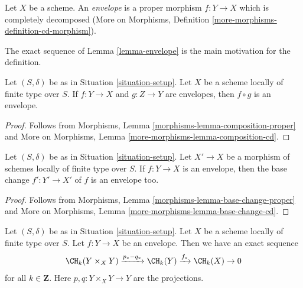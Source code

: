 \begin{definition}
\label{definition-envelope}
\begin{reference}
\cite[Definition 18.3]{F}
\end{reference}
Let $X$ be a scheme. An {\it envelope} is a proper morphism $f : Y \to X$
which is completely decomposed
(More on Morphisms, Definition \ref{more-morphisms-definition-cd-morphism}).
\end{definition}

\noindent
The exact sequence of Lemma \ref{lemma-envelope}
is the main motivation for the definition.

\begin{lemma}
\label{lemma-composition-envelope}
Let $(S, \delta)$ be as in Situation \ref{situation-setup}.
Let $X$ be a scheme locally of finite type over $S$.
If $f : Y \to X$ and $g : Z \to Y$ are envelopes, then
$f \circ g$ is an envelope.
\end{lemma}

\begin{proof}
Follows from Morphisms, Lemma \ref{morphisms-lemma-composition-proper}
and More on Morphisms, Lemma \ref{more-morphisms-lemma-composition-cd}.
\end{proof}

\begin{lemma}
\label{lemma-base-change-envelope}
Let $(S, \delta)$ be as in Situation \ref{situation-setup}.
Let $X' \to X$ be a morphism of schemes locally of finite type over $S$.
If $f : Y \to X$ is an envelope, then the base change $f' : Y' \to X'$
of $f$ is an envelope too.
\end{lemma}

\begin{proof}
Follows from Morphisms, Lemma \ref{morphisms-lemma-base-change-proper}
and More on Morphisms, Lemma \ref{more-morphisms-lemma-base-change-cd}.
\end{proof}

\begin{lemma}
\label{lemma-envelope}
Let $(S, \delta)$ be as in Situation \ref{situation-setup}.
Let $X$ be a scheme locally of finite type over $S$.
Let $f : Y \to X$ be an envelope. Then
we have an exact sequence
$$
\CH_k(Y \times_X Y) \xrightarrow{p_* - q_*}
\CH_k(Y) \xrightarrow{f_*}
\CH_k(X) \to 0
$$
for all $k \in \mathbf{Z}$. Here $p, q : Y \times_X Y \to Y$ are
the projections.
\end{lemma}

